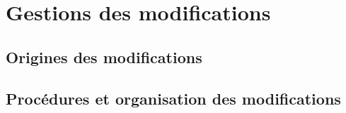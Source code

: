 \section{Gestions des modifications}

\subsection{Origines des modifications}


\subsection{Procédures et organisation des modifications}


\pagebreak
